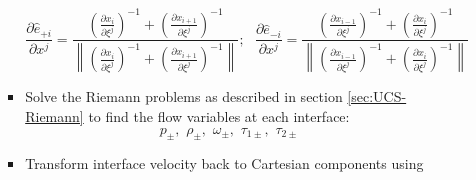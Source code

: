 \begin{itemize}
\begin{itemize}
\begin{itemize}
\begin{itemize}
          \[\frac{{\partial {{\hat e}_{ + i}}}}{{\partial {x^j}}} = \frac{{{{\left( {\frac{{\partial {x_i}}}{{\partial {\xi ^j}}}} \right)}^{ - 1}} + {{\left( {\frac{{\partial {x_{i + 1}}}}{{\partial {\xi ^j}}}} \right)}^{ - 1}}}}{{\left\| {{{\left( {\frac{{\partial {x_i}}}{{\partial {\xi ^j}}}} \right)}^{ - 1}} + {{\left( {\frac{{\partial {x_{i + 1}}}}{{\partial {\xi ^j}}}} \right)}^{ - 1}}} \right\|}};\,\,\,\,\frac{{\partial {{\hat e}_{ - i}}}}{{\partial {x^j}}} = \frac{{{{\left( {\frac{{\partial {x_{i - 1}}}}{{\partial {\xi ^j}}}} \right)}^{ - 1}} + {{\left( {\frac{{\partial {x_i}}}{{\partial {\xi ^j}}}} \right)}^{ - 1}}}}{{\left\| {{{\left( {\frac{{\partial {x_{i - 1}}}}{{\partial {\xi ^j}}}} \right)}^{ - 1}} + {{\left( {\frac{{\partial {x_i}}}{{\partial {\xi ^j}}}} \right)}^{ - 1}}} \right\|}}\]
        \item Solve the Riemann problems as described in section \ref{sec:UCS-Riemann} to find the flow variables at each interface: 
          \[{p_ \pm },\,\,{\rho _ \pm },\,\,{\omega _ \pm },\,\,{\tau _{1 \pm }},\,\,{\tau _{2 \pm }}\]
        \item Transform interface velocity back to Cartesian components using 

\end{itemize}
\end{itemize}
\end{itemize}
\end{itemize}

